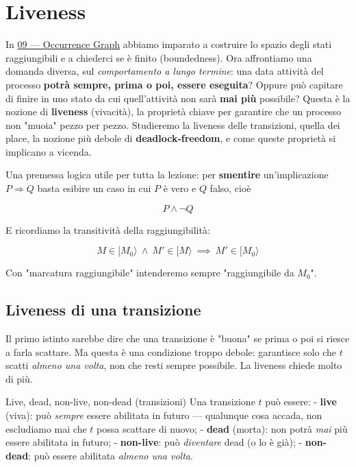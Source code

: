 \chapter{\texorpdfstring{Liveness}{Liveness}}
\label{ch:10}

In \hyperref[ch:09]{09 — Occurrence Graph} abbiamo imparato a costruire lo spazio degli stati raggiungibili e a chiederci se è finito (boundedness). Ora affrontiamo una domanda diversa, sul \emph{comportamento a lungo termine}: una data attività del processo \textbf{potrà sempre, prima o poi, essere eseguita}? Oppure può capitare di finire in uno stato da cui quell'attività non sarà \textbf{mai più} possibile? Questa è la nozione di \textbf{liveness} (vivacità), la proprietà chiave per garantire che un processo non "muoia" pezzo per pezzo. Studieremo la liveness delle transizioni, quella dei place, la nozione più debole di \textbf{deadlock-freedom}, e come queste proprietà si implicano a vicenda.

Una premessa logica utile per tutta la lezione: per \textbf{smentire} un'implicazione $P \Rightarrow Q$ basta esibire un caso in cui $P$ è vero e $Q$ falso, cioè

\[
P \wedge \neg Q
\]

E ricordiamo la transitività della raggiungibilità:

\[
M \in [M_0\rangle \ \wedge\ M' \in [M\rangle \ \implies\ M' \in [M_0\rangle
\]

Con "marcatura raggiungibile" intenderemo sempre "raggiungibile da $M_0$".

\section{\texorpdfstring{Liveness di una transizione}{Liveness di una transizione}}

Il primo istinto sarebbe dire che una transizione è "buona" se prima o poi si riesce a farla scattare. Ma questa è una condizione troppo debole: garantisce solo che $t$ scatti \emph{almeno una volta}, non che resti sempre possibile. La liveness chiede molto di più.

\begin{boxdefinition}{Live, dead, non-live, non-dead (transizioni)}
Una transizione $t$ può essere: - \textbf{live} (viva): può \emph{sempre} essere abilitata in futuro — qualunque cosa accada, non escludiamo mai che $t$ possa scattare di nuovo; - \textbf{dead} (morta): non potrà \emph{mai} più essere abilitata in futuro; - \textbf{non-live}: può \emph{diventare} dead (o lo è già); - \textbf{non-dead}: può essere abilitata \emph{almeno una volta}.
\end{boxdefinition}

